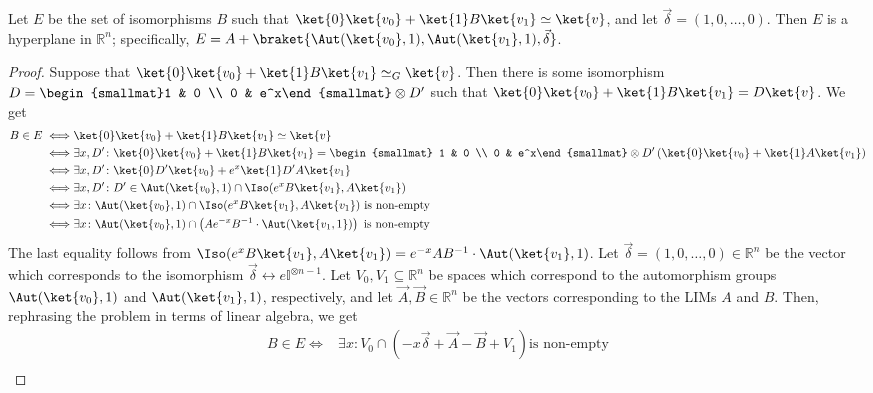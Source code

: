 \begin{lemma}
	\label{thm:eligible-isomorphisms}
	Let $E$ be the set of isomorphisms $B$ such that $\ket{0}\ket{v_0}+\ket{1}B\ket{v_1}\simeq\ket{v}$, and let $\vec\delta = (1,0,\ldots,0)$.
	Then $E$ is a hyperplane in $\mathbb R^n$; specifically, $E=A+\braket{\Aut(\ket{v_0},1),\Aut(\ket{v_1},1),\vec\delta}$.
\end{lemma}
\begin{proof}
	Suppose that $\ket{0}\ket{v_0}+\ket{1}B\ket{v_1}\simeq_G\ket{v}$.
	Then there is some isomorphism $D=\begin{smallmat}1 & 0 \\ 0 & e^x\end{smallmat}\otimes D^\prime$ such that $\ket{0}\ket{v_0}+\ket{1}B\ket{v_1}=D\ket{v}$.
	We get
	\begin{align}
		B\in E\iff & \ket{0}\ket{v_0}+\ket{1}B\ket{v_1}\simeq \ket{v} \\
 		\iff & \exists x,D^\prime\colon \ket{0}\ket{v_0}+\ket{1}B\ket{v_1} = \begin{smallmat} 1 & 0 \\ 0 & e^x\end{smallmat}\otimes D^\prime \left(\ket{0}\ket{v_0}+\ket{1}A\ket{v_1}\right) \\
		\iff & \exists x,D^\prime\colon \ket{0}D^\prime\ket{v_0}+e^x\ket{1}D^\prime A\ket{v_1} \\
		\iff & \exists x,D^\prime\colon D^\prime \in \Aut(\ket{v_0},1)\cap \Iso(e^xB\ket{v_1},A\ket{v_1}) \\
		\iff & \exists x\colon \Aut(\ket{v_0},1)\cap \Iso(e^xB\ket{v_1},A\ket{v_1})\text{ is non-empty} \\
		\iff & \exists x\colon \Aut(\ket{v_0},1)\cap \left( Ae^{-x}B^{-1}\cdot \Aut(\ket{v_1,1}) \right)\text{ is non-empty}
	\end{align}
	The last equality follows from $\Iso(e^xB\ket{v_1},A\ket{v_1})=e^{-x}AB^{-1}\cdot\Aut(\ket{v_1},1)$.
	Let $\vec\delta = (1,0,\ldots, 0)\in \mathbb R^n$ be the vector which corresponds to the isomorphism $\vec\delta \leftrightarrow e\mathbb I^{\otimes n-1}$.
	Let $V_0,V_1\subseteq \mathbb R^n$ be spaces which correspond to the automorphism groups $\Aut(\ket{v_0},1)$ and $\Aut(\ket{v_1},1)$, respectively, and let $\vec A,\vec B\in \mathbb R^n$ be the vectors corresponding to the LIMs $A$ and $B$.
	Then, rephrasing the problem in terms of linear algebra, we get
	\begin{align}
		B\in E \iff & \exists x\colon V_0\cap \left( -x\vec\delta +\vec A-\vec B+V_1 \right) \text{is non-empty} \\

\end{align}
\end{proof}
